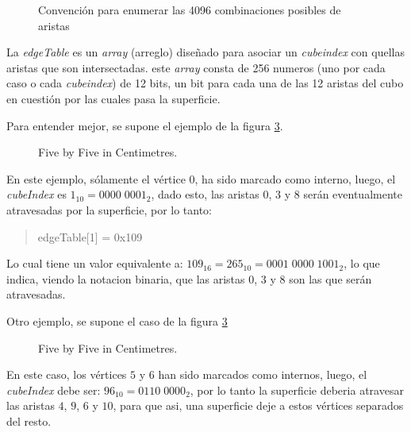 \begin{figure}[hbt]
	\makebox[\textwidth]{\framebox[0.4\textwidth]{\rule{0pt}{0.3\textwidth}}}
	\caption{Convención para enumerar las 4096 combinaciones posibles de aristas}
	\label{f:ch:implementacion:sec:CubeIndex:edgeTable:edge_convention}
\end{figure}

La \emph{edgeTable} es un \emph{array} (arreglo) diseñado para asociar un \emph{cubeindex} con quellas aristas que son intersectadas. este \emph{array} consta de 256 numeros (uno por cada caso o cada \emph{cubeindex}) de 12 bits, un bit para cada una de las 12 aristas del cubo en cuestión por las cuales pasa la superficie.

Para entender mejor, se supone el ejemplo de la figura \ref{f:ch:implementacion:sec:CubeIndex:edgeTable:example}.

\begin{figure}[hbt]
	\makebox[\textwidth]{\framebox[0.3\textwidth]{\rule{0pt}{0.2\textwidth}}}
	\caption{Five by Five in Centimetres.}
	\label{f:ch:implementacion:sec:CubeIndex:edgeTable:example}
\end{figure}

En este ejemplo, sólamente el vértice $0$, ha sido marcado como interno, luego, el \emph{cubeIndex} es $1_{10} = 0000 \; 0001_{2}$, dado esto, las aristas $0$, $3$ y $8$ serán eventualmente atravesadas por la superficie, por lo tanto:

\begin{quote}
	edgeTable[1] = 0x109
\end{quote}

Lo cual tiene un valor equivalente a: $109_{16} = 265_{10} = 0001 \; 0000 \; 1001_{2}$, lo que indica, viendo la notacion binaria, que las aristas $0$, $3$ y $8$ son las que serán atravesadas.

Otro ejemplo, se supone el caso de la figura \ref{f:ch:implementacion:sec:CubeIndex:edgeTable:example}

\begin{figure}[hbt]
	\makebox[\textwidth]{\framebox[0.3\textwidth]{\rule{0pt}{0.2\textwidth}}}
	\caption{Five by Five in Centimetres.}
	\label{f:ch:implementacion:sec:CubeIndex:edgeTable:example}
\end{figure}

En este caso, los vértices $5$ y $6$ han sido marcados como internos, luego, el \emph{cubeIndex} debe ser: $96_{10} = 0110 \; 0000_{2}$, por lo tanto la superficie deberia atravesar las aristas $4$, $9$, $6$ y $10$, para que asi, una superficie deje a estos vértices separados del resto.

